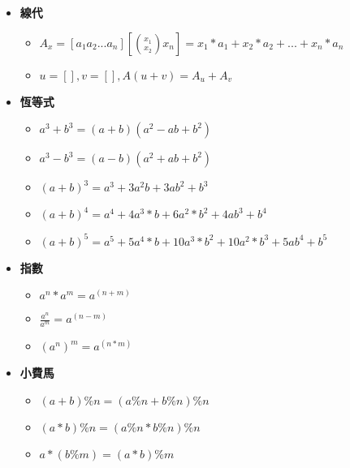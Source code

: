 \begin{itemize}
  \item \textbf{線代}
  \begin{itemize}
    \item $A_x = [a_1 a_2 ... a_n][\binom{x_1}{x_2}{x_n}] = x_1*a_1+x_2*a_2+...+x_n*a_n$
    \item $u=[], v=[], A(u+v) = A_u+A_v$
  \end{itemize}

  \item \textbf{恆等式}
  \begin{itemize}
    \item $a^3+b^3 = (a+b)(a^2-ab+b^2)$
    \item $a^3-b^3 = (a-b)(a^2+ab+b^2)$
    \item $(a+b)^3 = a^3+3a^2b+3ab^2+b^3$
    \item $(a+b)^4 = a^4+4a^3*b+6a^2*b^2+4ab^3+b^4$
    \item $(a+b)^5 = a^5+5a^4*b+10a^3*b^2+10a^2*b^3+5ab^4+b^5$
  \end{itemize}

  \item \textbf{指數}
  \begin{itemize}
    \item $a^n*a^m = a^(n+m)$
    \item $\frac{a^n}{a^m} = a^(n-m)$
    \item $(a^n)^m = a^(n*m)$
  \end{itemize}

  
  \item \textbf{小費馬}
  \begin{itemize}
    \item $(a+b)\%n = (a\%n+b\%n)\%n$
    \item $(a*b)\%n = (a\%n*b\%n)\%n$
    \item $a*(b\%m) = (a*b)\%m$
  \end{itemize}
\end{itemize}
